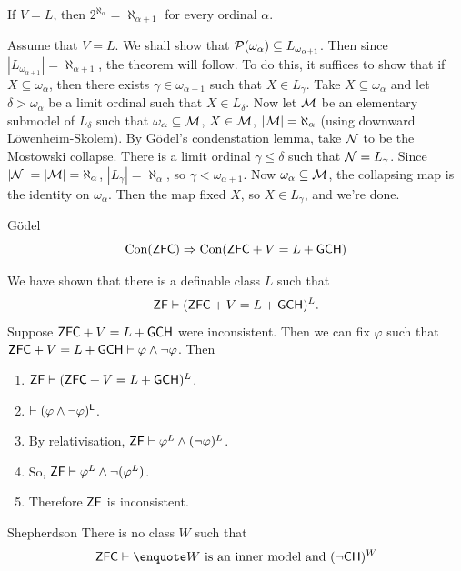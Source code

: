 \documentclass{article}
\begin{document}
\endproof
\begin{fancythm}{}
    If $V=L$, then $2^{\aleph_{\alpha}}=\aleph_{\alpha+1}$ for every ordinal $\alpha$.
\end{fancythm}
\proof Assume that $V=L$. We shall show that $\mathcal{P}(\omega_{\alpha}) \subseteq L_{\omega_{\alpha+1}}$. Then since $|L_{\omega_{\alpha+1}}| = \aleph_{\alpha+1}$, the theorem will follow. \gap
To do this, it suffices to show that if $X \subseteq \omega_{\alpha}$, then there exists $\gamma \in \omega_{\alpha+1}$ such that $X \in L_{\gamma}$. Take $X \subseteq \omega_{\alpha}$ and let $\delta > \omega_{\alpha}$ be a limit ordinal such that $X \in L_{\delta}$. Now let $\mathcal{M}$ be an elementary submodel of $L_{\delta}$ such that $\omega_{\alpha} \subseteq \mathcal{M}$, $X \in \mathcal{M}$, $|\mathcal{M}|=\aleph_{\alpha}$ (using downward L\"owenheim-Skolem). \gap
By G\"odel's condenstation lemma, take $\mathcal{N}$ to be the Mostowski collapse. There is a limit ordinal $\gamma \leq \delta$ such that $\mathcal{N} = L_{\gamma}$. Since $|\mathcal{N}| = |\mathcal{M}| = \aleph_{\alpha}$, $|L_{\gamma}|=\aleph_{\alpha}$, so $\gamma < \omega_{\alpha+1}$. Now $\omega_{\alpha} \subseteq \mathcal{M}$, the collapsing map is the identity on $\omega_{\alpha}$. Then the map fixed $X$, so $X \in L_{\gamma}$, and we're done. \endproof
\begin{fancythm}{G\"odel}
    \[\operatorname{Con}(\mathsf{ZFC}) \Rightarrow \operatorname{Con}(\mathsf{ZFC} + V=L + \mathsf{GCH})\]
\end{fancythm}
\proof We have shown that there is a definable class $L$ such that \[ \mathsf{ZF} \vdash (\mathsf{ZFC} + V=L + \mathsf{GCH})^{L}.\]
Suppose $\mathsf{ZFC} + V=L + \mathsf{GCH}$ were inconsistent. Then we can fix $\varphi$ such that $\mathsf{ZFC} + V=L + \mathsf{GCH} \vdash \varphi \wedge \neg \varphi$. Then \begin{enumerate}
    \item[(i)] $\mathsf{ZF} \vdash (\mathsf{ZFC} + V=L + \mathsf{GCH})^{L}$.
    \item[(ii)] $\sf \vdash (\varphi \wedge \neg \varphi)^{L}$.
    \item[(iii)] By relativisation, $\mathsf{ZF} \vdash \varphi^{L} \wedge (\neg \varphi)^{L}$.
    \item[iv] So, $\mathsf{ZF} \vdash \varphi^{L} \wedge \neg (\varphi^{L})$.
    \item[(v)] Therefore $\mathsf{ZF}$ is inconsistent.
\end{enumerate}
\begin{fancylem}{Shepherdson}
    There is no class $W$ such that \[\sfZFC \proves \text{\say{$W$ is an inner model} and } (\neg \sfCH)^{W}\]
\end{fancylem}
\end{document}
